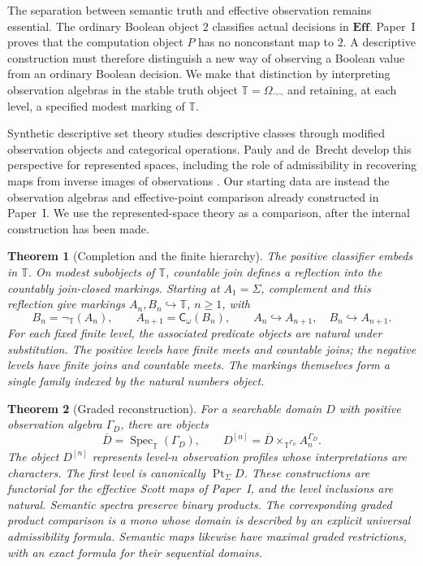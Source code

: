 \documentclass[11pt,a4paper]{article}
\numberwithin{equation}{section}
\theoremstyle{definition}
\theoremstyle{remark}
\theoremstyle{plain}
\newtheorem{maintheorem}{Theorem}
\newcommand{\E}{\mathbf{Eff}}
\newcommand{\TV}{\mathbb T}
\newcommand{\Pt}{\operatorname{Pt}_{\Sigma}}
\newcommand{\Spec}{\operatorname{Spec}}
\newcommand{\incl}{\hookrightarrow}
\newcommand{\Cw}{\mathsf C_{\omega}}
\newcommand{\negT}{\neg_{\TV}}
\begin{document}
The separation between semantic truth and effective observation remains
essential. The ordinary Boolean object $2$ classifies actual decisions in
$\E$. Paper~I proves that the computation object $P$ has no nonconstant
map to $2$. A descriptive construction must therefore distinguish a new
way of observing a Boolean value from an ordinary Boolean decision. We
make that distinction by interpreting observation algebras in the stable
truth object $\TV=\Omega_{\neg\neg}$ and retaining, at each level, a
specified modest marking of $\TV$.

Synthetic descriptive set theory studies descriptive classes through
modified observation objects and categorical operations. Pauly and
de~Brecht develop this perspective for represented spaces, including the
role of admissibility in recovering maps from inverse images of
observations \cite{paulydebrecht}. Our starting data are instead the
observation algebras and effective-point comparison already constructed in
Paper~I. We use the represented-space theory as a comparison, after the
internal construction has been made.

\begin{maintheorem}[Completion and the finite hierarchy]
\label{main:hierarchy}
The positive classifier embeds in $\TV$. On modest subobjects of $\TV$,
countable join defines a reflection into the countably join-closed
markings. Starting at $A_1=\Sigma$, complement and this reflection give
markings $A_n,B_n\incl\TV$, $n\geq1$, with
\[
 B_n=\negT(A_n),\qquad A_{n+1}=\Cw(B_n),\qquad
 A_n\incl A_{n+1},\quad B_n\incl A_{n+1}.
\]
For each fixed finite level, the associated predicate objects are natural
under substitution. The positive levels have finite meets and countable
joins; the negative levels have finite joins and countable meets.
The markings themselves form a single family indexed by the natural
numbers object.
\end{maintheorem}

\begin{maintheorem}[Graded reconstruction]
\label{main:spectra}
For a searchable domain $D$ with positive observation algebra $\Gamma_D$,
there are objects
\[
 \overline D=\Spec_{\TV}(\Gamma_D),\qquad
 D^{[n]}=\overline D\times_{\TV^{\Gamma_D}}A_n^{\Gamma_D}.
\]
The object $D^{[n]}$ represents level-$n$ observation profiles whose
interpretations are characters. The first level is canonically $\Pt D$.
These constructions are functorial for the effective Scott maps of
Paper~I, and the level inclusions are natural. Semantic spectra preserve
binary products. The corresponding graded product comparison is a mono
whose domain is described by an explicit universal admissibility formula.
Semantic maps likewise have maximal graded restrictions, with an exact
formula for their sequential domains.
\end{maintheorem}
\end{document}
